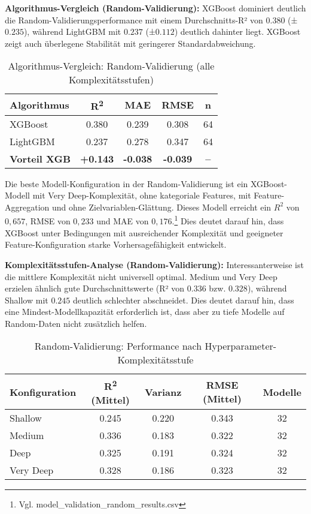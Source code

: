 \textbf{Algorithmus-Vergleich (Random-Validierung):}
XGBoost dominiert deutlich die Random-Validierungsperformance mit einem Durchschnitts-R² von $0.380$ (±$0.235$), während LightGBM mit $0.237$ (±$0.112$) deutlich dahinter liegt. XGBoost zeigt auch überlegene Stabilität mit geringerer Standardabweichung.

\begin{table}[H]
  \centering
  \begin{tabular}{lcccc}
    \toprule
    \textbf{Algorithmus} & \textbf{R\textsuperscript{2}} & \textbf{MAE} & \textbf{RMSE} & \textbf{n} \\
    \midrule
    XGBoost & 0.380 & 0.239 & 0.308 & 64 \\
    LightGBM & 0.237 & 0.278 & 0.347 & 64 \\
    \midrule
    \textbf{Vorteil XGB} & \textbf{+0.143} & \textbf{-0.038} & \textbf{-0.039} & \textbf{--} \\
    \bottomrule
  \end{tabular}
  \caption{Algorithmus-Vergleich: Random-Validierung (alle Komplexitätsstufen)}
  \label{tab:algo_random}
\end{table}

Die beste Modell-Konfiguration in der Random-Validierung ist ein XGBoost-Modell mit Very Deep-Komplexität, ohne kategoriale Features, mit Feature-Aggregation und ohne Zielvariablen-Glättung. Dieses Modell erreicht ein $R^2$ von $0{,}657$, RMSE von $0{,}233$ und MAE von $0{,}176$.\footnote{Vgl. model\_validation\_random\_results.csv} Dies deutet darauf hin, dass XGBoost unter Bedingungen mit ausreichender Komplexität und geeigneter Feature-Konfiguration starke Vorhersagefähigkeit entwickelt.


\textbf{Komplexitätsstufen-Analyse (Random-Validierung):}
Interessanterweise ist die mittlere Komplexität nicht universell optimal. Medium und Very Deep erzielen ähnlich gute Durchschnittswerte (R² von $0.336$ bzw. $0.328$), während Shallow mit $0.245$ deutlich schlechter abschneidet. Dies deutet darauf hin, dass eine Mindest-Modellkapazität erforderlich ist, dass aber zu tiefe Modelle auf Random-Daten nicht zusätzlich helfen.

\begin{table}[H]
  \centering
  \begin{tabular}{lcccc}
    \toprule
  	\textbf{Konfiguration} & \textbf{R\textsuperscript{2} (Mittel)} & \textbf{Varianz} & \textbf{RMSE (Mittel)} & \textbf{Modelle} \\
    \midrule
    Shallow & 0.245 & 0.220 & 0.343 & 32 \\
    Medium & 0.336 & 0.183 & 0.322 & 32 \\
    Deep & 0.325 & 0.191 & 0.324 & 32 \\
    Very Deep & 0.328 & 0.186 & 0.323 & 32 \\
    \bottomrule
  \end{tabular}
  \caption{Random-Validierung: Performance nach Hyperparameter-Komplexitätsstufe}
  \label{tab:complexity_random}
\end{table}

